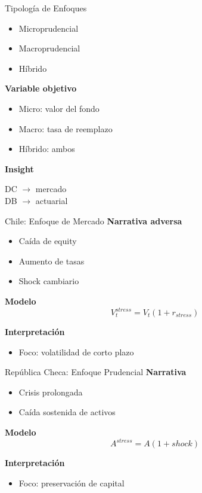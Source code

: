 \documentclass{beamer}
\begin{document}
\begin{frame}{Tipología de Enfoques}
\begin{itemize}
\item Microprudencial
\item Macroprudencial
\item Híbrido
\end{itemize}

\textbf{Variable objetivo}
\begin{itemize}
\item Micro: valor del fondo
\item Macro: tasa de reemplazo
\item Híbrido: ambos
\end{itemize}

\textbf{Insight}
\begin{block}{}
DC $\rightarrow$ mercado \\
DB $\rightarrow$ actuarial
\end{block}
\end{frame}

\begin{frame}[fragile]{Chile: Enfoque de Mercado}
\textbf{Narrativa adversa}
\begin{itemize}
\item Caída de equity
\item Aumento de tasas
\item Shock cambiario
\end{itemize}

\textbf{Modelo}
\[
V_t^{stress} = V_t (1 + r_{stress})
\]

\textbf{Interpretación}
\begin{itemize}
\item Foco: volatilidad de corto plazo
\end{itemize}
\end{frame}

\begin{frame}[fragile]{República Checa: Enfoque Prudencial}
\textbf{Narrativa}
\begin{itemize}
\item Crisis prolongada
\item Caída sostenida de activos
\end{itemize}

\textbf{Modelo}
\[
A^{stress} = A (1 + shock)
\]


\textbf{Interpretación}
\begin{itemize}
\item Foco: preservación de capital
\end{itemize}
\end{frame}
\end{document}
